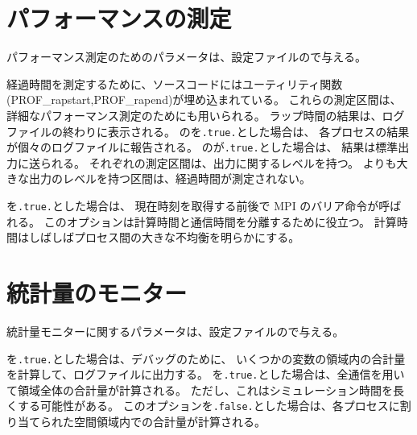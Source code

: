 \section{パフォーマンスの測定} \label{subsec:prof}

パフォーマンス測定のためのパラメータは、設定ファイルので与える。


\noindent
経過時間を測定するために、ソースコードにはユーティリティ関数(PROF\_rapstart,PROF\_rapend)が埋め込まれている。
これらの測定区間は、詳細なパフォーマンス測定のためにも用いられる。
%
ラップ時間の結果は、ログファイルの終わりに表示される。
のを\verb|.true.|とした場合は、
各プロセスの結果が個々のログファイルに報告される。
のが\verb|.true.|とした場合は、
結果は標準出力に送られる。
%
それぞれの測定区間は、出力に関するレベルを持つ。
よりも大きな出力のレベルを持つ区間は、経過時間が測定されない。

を\verb|.true.|とした場合は、
現在時刻を取得する前後で MPI のバリア命令が呼ばれる。
このオプションは計算時間と通信時間を分離するために役立つ。
計算時間はしばしばプロセス間の大きな不均衡を明らかにする。


\section{統計量のモニター} \label{subsec:statistics}

統計量モニターに関するパラメータは、設定ファイルので与える。


\noindent
{}を\verb|.true.|とした場合は、デバッグのために、
いくつかの変数の領域内の合計量を計算して、ログファイルに出力する。
%
を\verb|.true.|とした場合は、全通信を用いて領域全体の合計量が計算される。
ただし、これはシミュレーション時間を長くする可能性がある。
このオプションを\verb|.false.|とした場合は、各プロセスに割り当てられた空間領域内での合計量が計算される。

